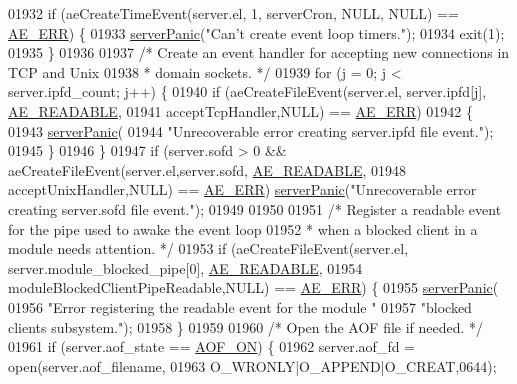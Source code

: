 \begin{DoxyCode}
{{{{{{{{{{{{{{{{{{{{{{{{{{{{01932     \textcolor{keywordflow}{if} (aeCreateTimeEvent(server.el, 1, serverCron, NULL, NULL) == \hyperlink{ae_8h_aa16dcf7effdf8f8df97f51b1cb51a9df}{AE\_ERR}) \{
01933         \hyperlink{server_8h_a11cc378e7778a830b41240578de3b204}{serverPanic}(\textcolor{stringliteral}{"Can't create event loop timers."});
01934         exit(1);
01935     \}
01936 
01937     \textcolor{comment}{/* Create an event handler for accepting new connections in TCP and Unix}
01938 \textcolor{comment}{     * domain sockets. */}
01939     \textcolor{keywordflow}{for} (j = 0; j < server.ipfd\_count; j++) \{
01940         \textcolor{keywordflow}{if} (aeCreateFileEvent(server.el, server.ipfd[j], \hyperlink{ae_8h_a7a9a2162d007d09739955b4e55c65bf3}{AE\_READABLE},
01941             acceptTcpHandler,NULL) == \hyperlink{ae_8h_aa16dcf7effdf8f8df97f51b1cb51a9df}{AE\_ERR})
01942             \{
01943                 \hyperlink{server_8h_a11cc378e7778a830b41240578de3b204}{serverPanic}(
01944                     \textcolor{stringliteral}{"Unrecoverable error creating server.ipfd file event."});
01945             \}
01946     \}
01947     \textcolor{keywordflow}{if} (server.sofd > 0 && aeCreateFileEvent(server.el,server.sofd,
      \hyperlink{ae_8h_a7a9a2162d007d09739955b4e55c65bf3}{AE\_READABLE},
01948         acceptUnixHandler,NULL) == \hyperlink{ae_8h_aa16dcf7effdf8f8df97f51b1cb51a9df}{AE\_ERR}) \hyperlink{server_8h_a11cc378e7778a830b41240578de3b204}{serverPanic}(\textcolor{stringliteral}{"Unrecoverable error creating
       server.sofd file event."});
01949 
01950 
01951     \textcolor{comment}{/* Register a readable event for the pipe used to awake the event loop}
01952 \textcolor{comment}{     * when a blocked client in a module needs attention. */}
01953     \textcolor{keywordflow}{if} (aeCreateFileEvent(server.el, server.module\_blocked\_pipe[0], 
      \hyperlink{ae_8h_a7a9a2162d007d09739955b4e55c65bf3}{AE\_READABLE},
01954         moduleBlockedClientPipeReadable,NULL) == \hyperlink{ae_8h_aa16dcf7effdf8f8df97f51b1cb51a9df}{AE\_ERR}) \{
01955             \hyperlink{server_8h_a11cc378e7778a830b41240578de3b204}{serverPanic}(
01956                 \textcolor{stringliteral}{"Error registering the readable event for the module "}
01957                 \textcolor{stringliteral}{"blocked clients subsystem."});
01958     \}
01959 
01960     \textcolor{comment}{/* Open the AOF file if needed. */}
01961     \textcolor{keywordflow}{if} (server.aof\_state == \hyperlink{server_8h_af6b151c9dced28e94c19479197113a83}{AOF\_ON}) \{
01962         server.aof\_fd = open(server.aof\_filename,
01963                                O\_WRONLY|O\_APPEND|O\_CREAT,0644);
}}}}}}}}}}}}}}}}}}}}}}}}}}}}
\end{DoxyCode}
